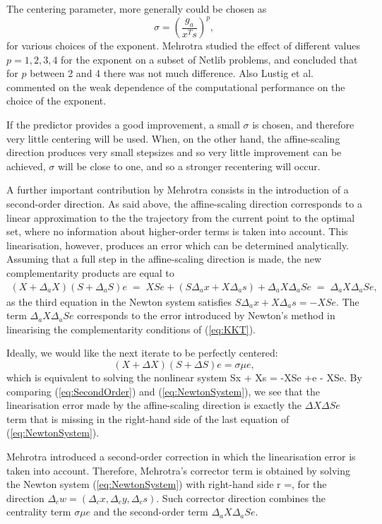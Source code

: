 The centering parameter, more generally could be chosen as
\[
  \sigma = \left( \frac{g_a}{x^Ts} \right)^p\!\!,
\]
for various choices of the exponent. Mehrotra \cite{Mehrotra92}
studied the effect of different values $p=1,2,3,4$ for the exponent
on a subset of Netlib problems, and concluded that for $p$ between
2 and 4 there was not much difference.
Also Lustig et al. \cite{LustigMarstenShanno} commented on the
weak dependence of the computational performance on the choice 
of the exponent.

If the predictor provides a good improvement, a small $\sigma$ 
is chosen, and therefore very little centering will be used. When, 
on the other hand, the affine-scaling direction produces very small stepsizes 
and so very little improvement can be achieved, $\sigma$ will be 
close to one, and so a stronger recentering will occur.

A further important contribution by Mehrotra consists in the 
introduction of a second-order direction. 
As said above, the affine-scaling direction 
corresponds to a linear approximation to the the trajectory from 
the current point to the optimal set, where no information about 
higher-order terms is taken into account. This linearisation, 
however, produces an error which can be determined analytically.
%
Assuming that a full step in the affine-scaling direction is made, 
the new complementarity products are equal to
%
\begin{eqnarray*}
  (X + \Delta_a X) (S + \Delta_a S) e 
   \;=\; XSe + (S \Delta_a x + X \Delta_a s) + \Delta_a X \Delta_a S e
   \;=\; \Delta_a X \Delta_a S e,
\end{eqnarray*}
%
as the third equation in the Newton system satisfies 
$S \Delta_a x + X \Delta_a s = -XSe.$
%
The term $\Delta_a X \Delta_a S e$ corresponds to the error introduced
by Newton's method in linearising the complementarity conditions of 
(\ref{eq:KKT}).

Ideally, we would like the next iterate to be perfectly centered: 
\[
  (X+\Delta X)(S+\Delta S)e = \sigma\mu e,
\]
which is equivalent to solving the nonlinear system
\be  \label{eq:SecondOrder}
  S\Delta x + X\Delta s = -XSe +\sigma\mu e - \Delta X\Delta Se.
\ee
By comparing (\ref{eq:SecondOrder}) and (\ref{eq:NewtonSystem}),
we see that 
the linearisation error made by the affine-scaling direction is exactly 
the $\Delta X\Delta Se$ term that is missing in the right-hand side
of the last equation of (\ref{eq:NewtonSystem}).

Mehrotra introduced a second-order correction in which the 
linearisation error is taken into account. Therefore, 
Mehrotra's corrector term is obtained by solving the Newton system 
(\ref{eq:NewtonSystem}) with right-hand side
\be \label{eq:MehrotraRhs}
r =,
\ee
for the direction $\Delta_c w = (\Delta_c x,\Delta_c y,\Delta_c s)$.
Such corrector direction combines the centrality term $\sigma \mu e$
and the second-order term $\Delta_a X\Delta_a Se$.

